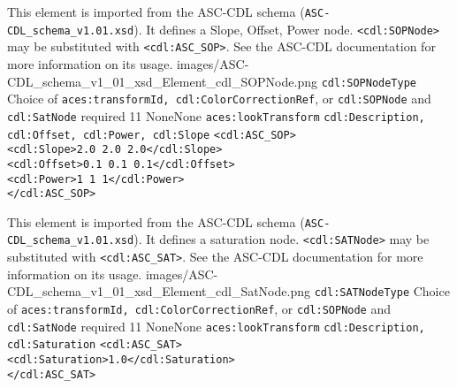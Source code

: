         {This element is imported from the ASC-CDL schema (\texttt{ASC-CDL\_schema\_v1.01.xsd}).  It defines a Slope, Offset, Power node.  \texttt{<cdl:SOPNode>} may be substituted with \texttt{<cdl:ASC\_SOP>}.  See the ASC-CDL documentation for more information on its usage.}
        {images/ASC-CDL_schema_v1_01_xsd_Element_cdl_SOPNode.png}
        {\texttt{cdl:SOPNodeType}}
        {Choice of \texttt{aces:transformId, cdl:ColorCorrectionRef}, or \texttt{cdl:SOPNode} and \\ \texttt{cdl:SatNode} required}
        {1}{1}
        {None}{None}
        {\texttt{aces:lookTransform}}
        {\texttt{cdl:Description, cdl:Offset, cdl:Power, cdl:Slope}}
        {\lstinline{<cdl:ASC_SOP>}\\
                    \lstinline{<cdl:Slope>2.0 2.0 2.0</cdl:Slope>}\\
                    \lstinline{<cdl:Offset>0.1 0.1 0.1</cdl:Offset>}\\
                    \lstinline{<cdl:Power>1 1 1</cdl:Power>}\\
                    \lstinline{</cdl:ASC_SOP>}}

        {This element is imported from the ASC-CDL schema (\texttt{ASC-CDL\_schema\_v1.01.xsd}).  It defines a saturation node.  \texttt{<cdl:SATNode>} may be substituted with \texttt{<cdl:ASC\_SAT>}.  See the ASC-CDL documentation for more information on its usage.}
        {images/ASC-CDL_schema_v1_01_xsd_Element_cdl_SatNode.png}
        {\texttt{cdl:SATNodeType}}
        {Choice of \texttt{aces:transformId, cdl:ColorCorrectionRef}, or \texttt{cdl:SOPNode} and \\ \texttt{cdl:SatNode} required}
        {1}{1}
        {None}{None}
        {\texttt{aces:lookTransform}}
        {\texttt{cdl:Description, cdl:Saturation}}
        {\lstinline{<cdl:ASC_SAT>}\\
                    \lstinline{<cdl:Saturation>1.0</cdl:Saturation>}\\
                    \lstinline{</cdl:ASC_SAT>}}

